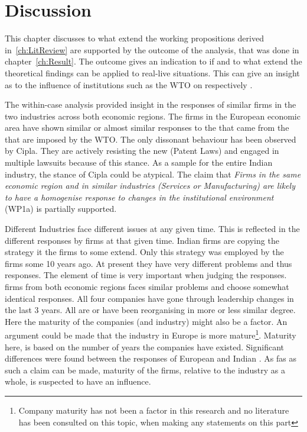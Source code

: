 \chapter{Discussion}
This chapter discusses to what extend the working propositions derived in~\ref{ch:LitReview} are supported by the outcome of the analysis, that was done in chapter~\ref{ch:Result}.
The outcome gives an indication to if and to what extend the theoretical findings can be applied to real-live situations.
This can give an insight as to the influence of institutions such as the WTO on  respectively .

The within-case analysis provided insight in the responses of similar firms in the two industries across both economic regions.
The firms in the European economic area have shown similar or almost similar responses to the \cc that came from the \rr that are imposed by the WTO\@.
The only dissonant behaviour has been observed by Cipla.
They are actively resisting the new \rr (Patent Laws) and engaged in multiple lawsuits because of this stance.
As a sample for the entire Indian \pharma industry, the stance of Cipla could be atypical.
The claim that \textit{Firms in the same economic region and in similar industries (Services or Manufacturing) are likely to have a homogenise response to changes in the institutional environment} (WP1a) is partially supported.

Different Industries face different issues at any given time.
This is reflected in the different responses by firms at that given time.
Indian \pharma firms are copying the strategy it the \its firms to some extend. 
Only this strategy was employed by the \its firms some 10 years ago.
At present they have very different problems and thus responses.
The element of time is very important when judging the responses.\\
\its firms from both economic regions faces similar problems and choose somewhat identical responses.
All four companies have gone through leadership changes in the last 3 years. 
All are or have been reorganising in more or less similar degree.
Here the maturity of the companies (and industry) might also be a factor.
An argument could be made that the \pharma industry in Europe is more mature\footnote{Company maturity has not been a factor in this research and no literature has been consulted on this topic, when making any statements on this part}.
Maturity here, is based on the number of years the companies have existed.
Significant differences were found between the responses of European \pharmas and Indian \pharmas.
As fas as such a claim can be made,  maturity of the firms, relative to the industry as a whole, is suspected to have an influence.

